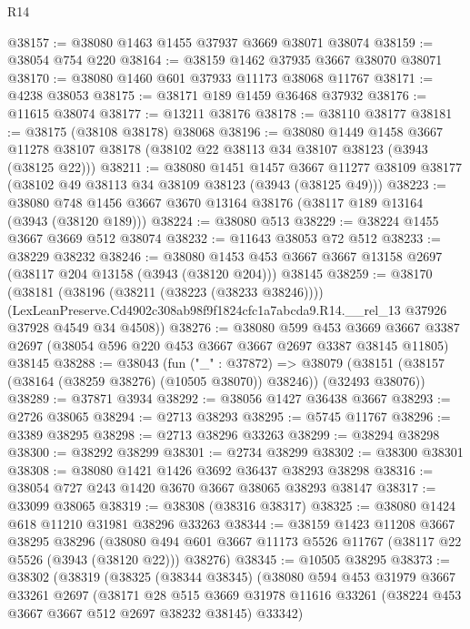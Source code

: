 \begin{lexlean}{R14}
\begin{coremodule}
@38157 := @38080 @1463 @1455 @37937 @3669 @38071 @38074
@38159 := @38054 @754 @220
@38164 := @38159 @1462 @37935 @3667 @38070 @38071
@38170 := @38080 @1460 @601 @37933 @11173 @38068 @11767
@38171 := @4238 @38053
@38175 := @38171 @189 @1459 @36468 @37932
@38176 := @11615 @38074
@38177 := @13211 @38176
@38178 := @38110 @38177
@38181 := @38175 (@38108 @38178) @38068
@38196 := @38080
    @1449
    @1458
    @3667
    @11278
    @38107
    @38178
    (@38102 @22 @38113 @34 @38107 @38123 (@3943 (@38125 @22)))
@38211 := @38080
    @1451
    @1457
    @3667
    @11277
    @38109
    @38177
    (@38102 @49 @38113 @34 @38109 @38123 (@3943 (@38125 @49)))
@38223 := @38080 @748 @1456 @3667 @3670 @13164 @38176 (@38117 @189 @13164 (@3943 (@38120 @189)))
@38224 := @38080 @513
@38229 := @38224 @1455 @3667 @3669 @512 @38074
@38232 := @11643 @38053 @72 @512
@38233 := @38229 @38232
@38246 := @38080
    @1453
    @453
    @3667
    @3667
    @13158
    @2697
    (@38117 @204 @13158 (@3943 (@38120 @204)))
    @38145
@38259 := @38170
    (@38181
      (@38196 (@38211 (@38223 (@38233 @38246))))
      (LexLeanPreserve.Cd4902c308ab98f9f1824cfc1a7abcda9.R14.__rel_13
        @37926
        @37928
        @4549
        @34
        @4508))
@38276 := @38080
    @599
    @453
    @3669
    @3667
    @3387
    @2697
    (@38054 @596 @220 @453 @3667 @3667 @2697 @3387 @38145 @11805)
    @38145
@38288 := @38043
    (fun ("_" : @37872) =>
    @38079 (@38151 (@38157 (@38164 (@38259 @38276) (@10505 @38070)) @38246)) (@32493 @38076))
@38289 := @37871 @3934
@38292 := @38056 @1427 @36438 @3667
@38293 := @2726 @38065
@38294 := @2713 @38293
@38295 := @5745 @11767
@38296 := @3389 @38295
@38298 := @2713 @38296 @33263
@38299 := @38294 @38298
@38300 := @38292 @38299
@38301 := @2734 @38299
@38302 := @38300 @38301
@38308 := @38080 @1421 @1426 @3692 @36437 @38293 @38298
@38316 := @38054 @727 @243 @1420 @3670 @3667 @38065 @38293 @38147
@38317 := @33099 @38065
@38319 := @38308 (@38316 @38317)
@38325 := @38080 @1424 @618 @11210 @31981 @38296 @33263
@38344 := @38159
    @1423
    @11208
    @3667
    @38295
    @38296
    (@38080 @494 @601 @3667 @11173 @5526 @11767 (@38117 @22 @5526 (@3943 (@38120 @22))) @38276)
@38345 := @10505 @38295
@38373 := @38302
    (@38319
      (@38325
        (@38344 @38345)
        (@38080
          @594
          @453
          @31979
          @3667
          @33261
          @2697
          (@38171
            @28
            @515
            @3669
            @31978
            @11616
            @33261
            (@38224 @453 @3667 @3667 @512 @2697 @38232 @38145)
            @33342)

\end{coremodule}
\end{lexlean}
